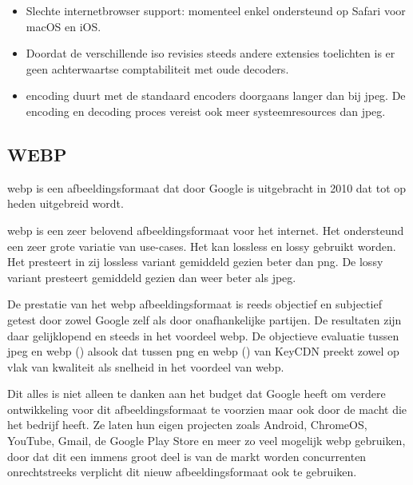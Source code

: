 \begin{itemize}
	\item Slechte internetbrowser support: momenteel enkel ondersteund op Safari voor macOS en iOS. 
	
	\item Doordat de verschillende \gls{iso} revisies steeds andere \glspl{extensie} toelichten is er geen achterwaartse comptabiliteit met oude \glspl{decoder}.
	
	\item \Gls{encoding} duurt met de standaard \glspl{encoder} doorgaans langer dan bij \gls{jpeg}. De \gls{encoding} en \gls{decoding} proces vereist ook meer systeemresources dan \gls{jpeg}.
\end{itemize}

\subsection{WEBP}
\label{sec:afbeeldingscompressie-webp}

\Gls{webp} is een \gls{afbeeldingsformaat} dat door Google is uitgebracht in 2010 dat tot op heden uitgebreid wordt. 
 
\Gls{webp} is een zeer belovend \gls{afbeeldingsformaat} voor het internet. Het ondersteund een zeer grote variatie van \glspl{use-case}. Het kan \gls{lossless} en \gls{lossy} gebruikt worden. Het presteert in zij \gls{lossless} variant gemiddeld gezien beter dan \gls{png}. De \gls{lossy} variant presteert gemiddeld gezien dan weer beter als \gls{jpeg}.

De prestatie van het \gls{webp} \gls{afbeeldingsformaat} is reeds objectief en subjectief getest door zowel Google zelf als door onafhankelijke partijen. De resultaten zijn daar gelijklopend en steeds in het voordeel \gls{webp}. De objectieve evaluatie tussen \gls{jpeg} en \gls{webp} (\cite{jpegwebp}) alsook dat tussen \gls{png} en \gls{webp} (\cite{pngwebp}) van KeyCDN preekt zowel op vlak van kwaliteit als snelheid in het voordeel van \gls{webp}.

Dit alles is niet alleen te danken aan het budget dat Google heeft om verdere ontwikkeling voor dit \gls{afbeeldingsformaat} te voorzien maar ook door de macht die het bedrijf heeft. Ze laten hun eigen projecten zoals Android, ChromeOS, YouTube, Gmail, de Google Play Store en meer zo veel mogelijk \gls{webp} gebruiken, door dat dit een immens groot deel is van de markt worden concurrenten onrechtstreeks verplicht dit nieuw \gls{afbeeldingsformaat} ook te gebruiken.


